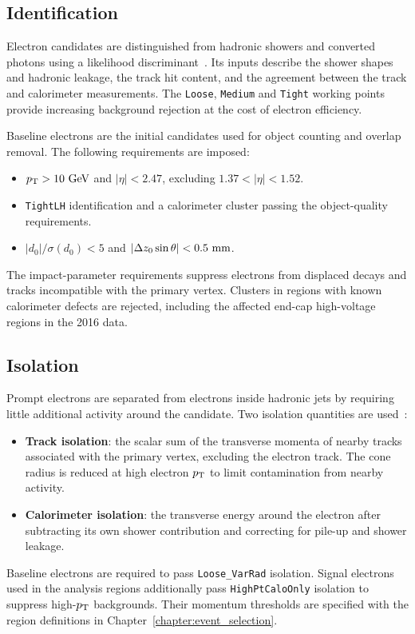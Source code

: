 \subsection{Identification}

Electron candidates are distinguished from hadronic showers and converted photons using a likelihood discriminant~\cite{ATLAS2019ElectronReco}.
Its inputs describe the shower shapes and hadronic leakage, the track hit content, and the agreement between the track and calorimeter measurements.
The \texttt{Loose}, \texttt{Medium} and \texttt{Tight} working points provide increasing background rejection at the cost of electron efficiency.

Baseline electrons are the initial candidates used for object counting and overlap removal.
The following requirements are imposed:
\begin{itemize}
    \item $p_{\mathrm{T}}>10~\mathrm{GeV}$ and $|\eta|<2.47$, excluding $1.37<|\eta|<1.52$.
    \item \texttt{TightLH} identification and a calorimeter cluster passing the object-quality requirements.
    \item $|d_0|/\sigma(d_0)<5$ and $|\Delta z_0\sin\theta|<0.5~\mathrm{mm}$.
\end{itemize}
The impact-parameter requirements suppress electrons from displaced decays and tracks incompatible with the primary vertex.
Clusters in regions with known calorimeter defects are rejected, including the affected end-cap high-voltage regions in the 2016 data.

\subsection{Isolation}

Prompt electrons are separated from electrons inside hadronic jets by requiring little additional activity around the candidate.
Two isolation quantities are used~\cite{ATLAS2019ElectronPerformance}:
\begin{itemize}
    \item \textbf{Track isolation}: the scalar sum of the transverse momenta of nearby tracks associated with the primary vertex, excluding the electron track. The cone radius is reduced at high electron $p_{\mathrm{T}}$ to limit contamination from nearby activity.
    \item \textbf{Calorimeter isolation}: the transverse energy around the electron after subtracting its own shower contribution and correcting for pile-up and shower leakage.
\end{itemize}
Baseline electrons are required to pass \texttt{Loose\_VarRad} isolation.
Signal electrons used in the analysis regions additionally pass \texttt{HighPtCaloOnly} isolation to suppress high-$p_{\mathrm{T}}$ backgrounds.
Their momentum thresholds are specified with the region definitions in Chapter~\ref{chapter:event_selection}.

